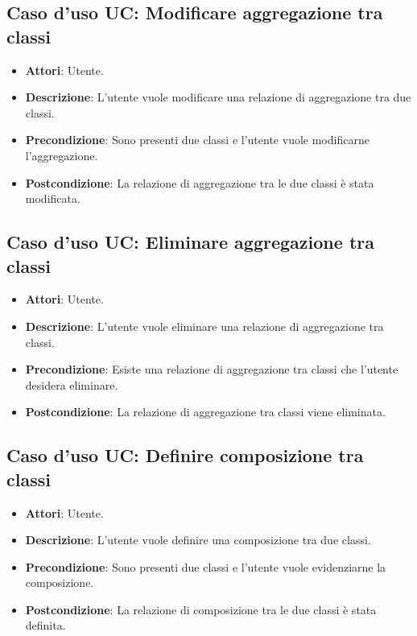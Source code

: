\documentclass[../AnalisiDeiRequisiti.tex]{subfiles}
\begin{document}
		\subsection{Caso d'uso UC: Modificare aggregazione tra classi}
		\begin{itemize}
			\item\textbf{Attori}: Utente.
			\item\textbf{Descrizione}: L'utente vuole modificare una relazione di aggregazione tra due classi.
			\item\textbf{Precondizione}: Sono presenti due classi e l'utente vuole modificarne l'aggregazione.
			\item\textbf{Postcondizione}: La relazione di aggregazione tra le due classi è stata modificata.
		\end{itemize}
		
		\subsection{Caso d'uso UC: Eliminare aggregazione tra classi}
		\begin{itemize}
			\item\textbf{Attori}: Utente.
			\item\textbf{Descrizione}: L'utente vuole eliminare una relazione di aggregazione tra classi.
			\item\textbf{Precondizione}: Esiste una relazione di aggregazione tra classi che l'utente desidera eliminare.
			\item\textbf{Postcondizione}: La relazione di aggregazione tra classi viene eliminata.
		\end{itemize}
		
		\subsection{Caso d'uso UC: Definire composizione tra classi}
		\begin{itemize}
			\item\textbf{Attori}: Utente.
			\item\textbf{Descrizione}: L'utente vuole definire una composizione tra due classi.
			\item\textbf{Precondizione}: Sono presenti due classi e l'utente vuole evidenziarne la composizione.
			\item\textbf{Postcondizione}: La relazione di composizione tra le due classi è stata definita.
		\end{itemize}
		
\end{document}
